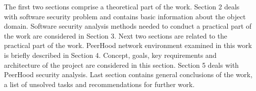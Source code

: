 %
The first two sections comprise a theoretical part of the work. 
%
Section 2 deals with software security problem and contains basic information about the object domain. 
%
Software security analysis methods needed to conduct a practical part of the work are considered in Section 3. 
%
Next two sections are related to the practical part of the work. 
%
PeerHood network environment examined in this work is briefly described in Section 4. 
%
Concept, goals, key requirements and architecture of the project are considered in this section. 
%
Section 5 deals with PeerHood security analysis. 
%
Last section contains general conclusions of the work, a list of unsolved tasks and recommendations for further work. 